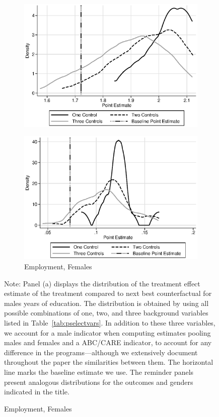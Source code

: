 \begin{figure}
\begin{subfigure}[h]{0.4\textwidth}
		\includegraphics[width=\textwidth]{output/sencontrols_female_years_30y_itt_wctrl.eps}
\end{subfigure}%
\begin{subfigure}[h]{0.4\textwidth}
	\centering
	\caption{Employment, Females}
		\includegraphics[width=\textwidth]{output/sencontrols_female_si30y_works_itt_wctrl.eps}
\end{subfigure}
\footnotesize \justify
Note: Panel (a) displays the distribution of the treatment effect estimate of the treatment compared to next best counterfactual for males years of education. The distribution is obtained by using all possible combinations of one, two, and three background variables listed in Table~\ref{tab:pselectvars}. In addition to these three variables, we account for a male indicator when computing estimates pooling males and females and a ABC/CARE indicator, to account for any difference in the programs---although we extensively document throughout the paper the similarities between them. The horizontal line marks the baseline estimate we use. The reminder panels present analogous distributions for the outcomes and genders indicated in the title.\\
\end{figure}

